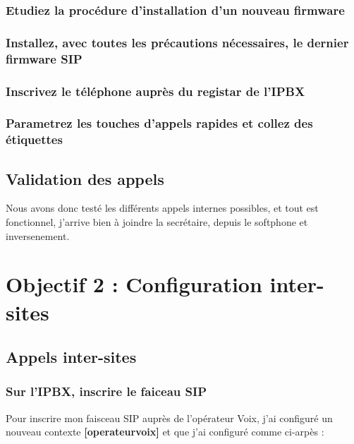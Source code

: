 \documentclass[12pt, a4paper]{article}
\begin{document}
	\subsubsection*{Etudiez la procédure d'installation d'un nouveau firmware}

	\subsubsection*{Installez, avec toutes les précautions nécessaires, le dernier firmware SIP}

	\subsubsection*{Inscrivez le téléphone auprès du registar de l'IPBX}
	
	\subsubsection*{Parametrez les touches d'appels rapides et collez des étiquettes}

\subsection{Validation des appels}
Nous avons donc testé les différents appels internes possibles, et tout 
est fonctionnel, j'arrive bien à joindre la secrétaire, depuis le 
softphone et inversenement. 

\newpage
\section{Objectif 2 : Configuration inter-sites}
	\subsection{Appels inter-sites}
	\subsubsection{Sur l'IPBX, inscrire le faiceau SIP}
	Pour inscrire mon faisceau SIP auprès de l'opérateur Voix, j'ai 
	configuré un nouveau contexte \textbf{[operateurvoix]} et que j'ai configuré
	comme ci-arpès : 
\end{document}
